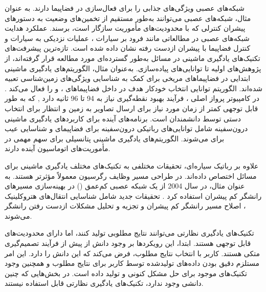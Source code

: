 \documentclass[a4paper]{article}
\begin{document}
{شبکه‌های عصبی ویژگی‌های جذابی را برای فعال‌سازی  در فضاپیما دارند. به عنوان مثال، شبکه‌های عصبی می‌توانند به‌طور مستقیم از تخمین‌های وضعیت به دستورهای پیشران کنترلی که با محدودیت‌های مأموریت سازگار است، برسند. عملکرد هدایت شبکه‌های عصبی در مطالعاتی مانند فرود بر سیارات \cite{gaudet2020six}، عملیات نزدیکی به سیارات \cite{gaudet2020terminal} و کنترل فضاپیما با پیشران ازدست رفته \cite{rubinsztejn2020neural} نشان داده شده است.
تازه‌ترین پیشرفت‌های تکنیک‌های یادگیری ماشینی در مسائل  به‌طور گسترده‌ای مورد مطالعه قرار گرفته‌اند، از پژوهش‌های اولیه تا توانایی‌های پیاده‌سازی.
به‌عنوان مثال، الگوریتم‌های یادگیری ماشینی ابتدایی در فضاپیماهای مریخی برای کمک به شناسایی ویژگی‌های زمین‌شناسی تعبیه شده‌اند. الگوریتم  توانایی انتخاب خودکار هدف  در داخل فضاپیماهای ،  و  را فعال می‌کند
\cite{estlin2012aegis}.
  در کامپیوتر پرواز اصلی ، فرآیند بهبود نقطه‌گیری نیاز به 94 تا 96 ثانیه دارد 
  \cite{francis2017aegis},
   که به طور قابل توجهی کمتر از زمان مورد نیاز برای ارسال تصاویر به زمین و انتظار برای انتخاب دستی توسط دانشمندان است.
   برنامه‌های آینده برای کاربردهای یادگیری ماشینی درون‌سفینه شامل توانایی‌های رباتیکی درون‌سفینه برای فضاپیمای 
\cite{higa2019vision, rothrock2016spoc}
     و شناسایی عیب برای 
\cite{wagstaff2019enabling} می‌شوند. الگوریتم‌های یادگیری ماشینی پتانسیلی برای سهم مهمی در مأموریت‌های اتوماسیون آینده دارند.


علاوه بر رباتیک سیاره‌ای، تحقیقات مختلفی به تکنیک‌های مختلف یادگیری ماشینی برای مسائل  اختصاص داده‌اند. در طراحی مسیر وظایف رگرسیون معمولاً مؤثرتر هستند. به عنوان مثال،  در سال 2004 از یک شبکه عصبی کم‌عمق () در بهینه‌سازی مسیرهای رانشگر کم پیشران استفاده کرد 
\cite{dachwald2004evolutionary}.
 تحقیقات جدید شامل شناسایی انتقال‌های هتروکلینیک \cite{desmet2019identifying}، اصلاح مسیر رانشگر کم پیشران\cite{parrish2018lowthrust} و تجزیه و تحلیل مشکلات ازدست رفتن رانشگر\cite{rubinsztejn2020neural} می‌شوند.
 
تکنیک‌های یادگیری نظارتی می‌توانند نتایج مطلوبی تولید کنند، اما دارای محدودیت‌های قابل توجهی هستند. ابتدا، این رویکردها بر وجود دانش از پیش از فرآیند تصمیم‌گیری متکی هستند. کاربر با انتخاب نتایج مطلوب، فرض می‌کند که این دانش را دارد. این امر مستلزم دقیق بودن داده‌های تولید‌شده توسط کاربر برای نتایج مطلوب و همچنین وجود تکنیک‌های موجود برای حل مشکل کنونی و تولید داده است. در بخش‌هایی که چنین دانشی وجود ندارد، تکنیک‌های یادگیری نظارتی قابل استفاده نیستند.

}
\end{document}
